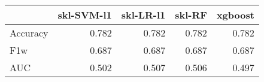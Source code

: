\begin{tabular}{lrrrr}
\toprule
{} &  skl-SVM-l1 &  skl-LR-l1 &  skl-RF &  xgboost \\
\midrule
Accuracy &       0.782 &      0.782 &   0.782 &    0.782 \\
F1w      &       0.687 &      0.687 &   0.687 &    0.687 \\
AUC      &       0.502 &      0.507 &   0.506 &    0.497 \\
\bottomrule
\end{tabular}
